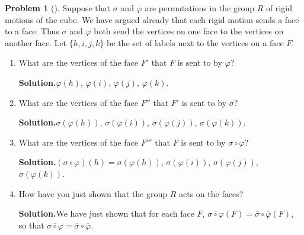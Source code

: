 \documentclass[10pt,]{book}
\theoremstyle{plain}
\theoremstyle{definition}
\newtheorem{activity}[project]{Problem}
\theoremstyle{definition}
\numberwithin{equation}{chapter}
\begin{document}
\begin{activity}[]\label{activity-283}
Suppose that \(\sigma\) and \(\varphi\) are permutations in the group \(R\) of rigid motions of the cube. We have argued already that each rigid motion sends a face to a face. Thus \(\sigma\) and \(\varphi\) both send the vertices on one face to the vertices on another face. Let \(\{h,i,j,k\}\) be the set of labels next to the vertices on a face \(F\).%
\begin{enumerate}[font=\bfseries,label=(\alph*),ref=\alph*]
\item\label{task-204} What are the vertices of the face \(F'\) that \(F\) is sent to by \(\varphi\)?%
\par\medskip\noindent%
\textbf{Solution.}\quad \(\varphi(h)\), \(\varphi(i)\), \(\varphi(j)\), \(\varphi(k)\).%
\item\label{task-205} What are the vertices of the face \(F''\) that \(F'\) is sent to by \(\sigma\)?%
\par\medskip\noindent%
\textbf{Solution.}\quad \(\sigma(\varphi(h))\), \(\sigma(\varphi(i))\), \(\sigma(\varphi(j))\), \(\sigma(\varphi(k))\).%
\item\label{task-206} What are the vertices of the face \(F'''\) that \(F\) is sent to by \(\sigma\circ\varphi\)?%
\par\medskip\noindent%
\textbf{Solution.}\quad \((\sigma\circ\varphi)(h)=\sigma(\varphi(h))\), \(\sigma(\varphi(i))\), \(\sigma(\varphi(j))\), \(\sigma(\varphi(k))\).%
\item\label{task-207} How have you just shown that the group \(R\) acts on the faces?%
\par\medskip\noindent%
\textbf{Solution.}\quad We have just shown that for each face \(F\), \(\overline{\sigma\circ\varphi}(F) = \overline{\sigma} \circ \overline{\varphi}(F)\), so that \(\overline{\sigma\circ\varphi} = \overline{\sigma} \circ
\overline{\varphi}\).%
\end{enumerate}
\end{activity}
\typeout{************************************************}
\typeout{************************************************}
\end{document}
